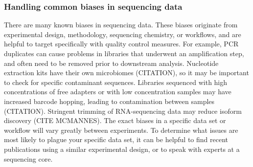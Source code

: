 \documentclass[10pt,letterpaper]{article}
\begin{document}

\subsubsection*{Handling common biases in sequencing data} %

There are many known biases in sequencing data. 
These biases originate from experimental design, methodology, sequencing chemistry, or workflows, and are helpful to target specifically with quality control measures. 
For example, PCR duplicates can cause problems in libraries that underwent an amplification step, and often need to be removed prior to downstream analysis. 
Nucleotide extraction kits have their own microbiomes (CITATION), so it may be important to check for specific contaminant sequences. 
Libraries sequenced with high concentrations of free adapters or with low concentration samples may have increased barcode hopping, leading to contamination between samples (CITATION). 
Stringent trimming of RNA-sequencing data may reduce isoform discovery (CITE MCMANNES). 
The exact biases in a specific data set or workflow will vary greatly between experiments. 
To determine what issues are most likely to plague your specific data set, it can be helpful to find recent publications using a similar experimental design, or to speak with experts at a sequencing core.
\end{document}
